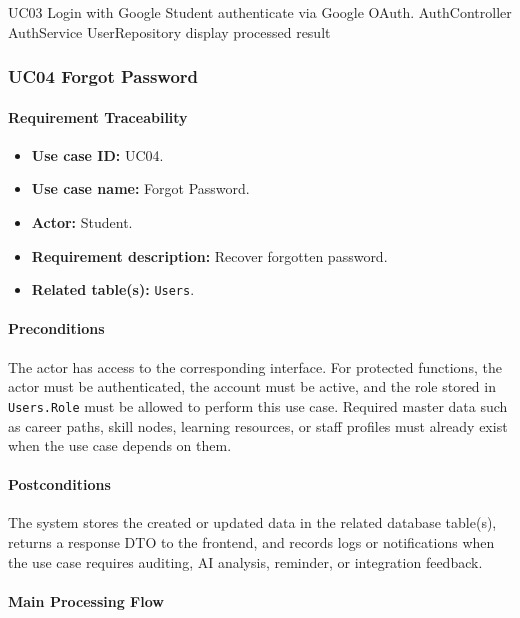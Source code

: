 \SequenceDiagram
{UC03 Login with Google}
{Student}
{authenticate via Google OAuth.}
{AuthController}
{AuthService}
{UserRepository}
{display processed result}

\subsubsection{UC04 Forgot Password}

\paragraph{Requirement Traceability}

\begin{itemize}
    \item \textbf{Use case ID:} UC04.
    \item \textbf{Use case name:} Forgot Password.
    \item \textbf{Actor:} Student.
    \item \textbf{Requirement description:} Recover forgotten password.
    \item \textbf{Related table(s):} \texttt{Users}.
\end{itemize}

\paragraph{Preconditions}

The actor has access to the corresponding interface. For protected functions, the actor must be authenticated, the account must be active, and the role stored in \texttt{Users.Role} must be allowed to perform this use case. Required master data such as career paths, skill nodes, learning resources, or staff profiles must already exist when the use case depends on them.

\paragraph{Postconditions}

The system stores the created or updated data in the related database table(s), returns a response DTO to the frontend, and records logs or notifications when the use case requires auditing, AI analysis, reminder, or integration feedback.

\paragraph{Main Processing Flow}

